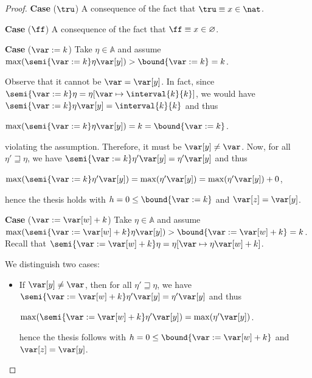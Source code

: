 \begin{proof}
  \medskip
  
  \noindent
  \textbf{Case} (\(\tru\))
  A consequence of the fact that \(\tru \equiv x\in \nat\). 

  \medskip
  
  \noindent
  \textbf{Case} (\(\ff\))
  A consequence of the fact that \(\ff \equiv x\in \varnothing\). 


  
  \medskip
  
  \noindent
  \textbf{Case} (\(\var := k\))
  Take \(\eta \in \mathbb{A}\) and assume
  \(\max(\semi{\var := k}\eta \var[y]) > \bound{\var := k} = k\).

  Observe that it cannot be \(\var = \var[y]\). In fact, since
  \(\semi{\var := k}\eta = \eta[\var \mapsto \interval{k}{k}]\), we would have
  \(\semi{\var := k}\eta \var[y] = \interval{k}{k}\) and thus
  \begin{center}
    \(\max(\semi{\var := k}\eta \var[y]) = k  = \bound{\var := k}\).
  \end{center}
  violating the assumption.
  Therefore, it must be \(\var[y] \neq \var\). Now, for all
  \(\eta' \sqsupseteq \eta\), we have
  \(\semi{\var := k}\eta' \var[y] = \eta' \var[y]\) and thus
  \begin{center}
    \(\max(\semi{\var := k}\eta' \var[y]) = \max(\eta' \var[y]) =
    \max(\eta' \var[y]) + 0\),
  \end{center}
  hence the thesis holds with \(h =0 \leq \bound{\var :=k}\) and \(\var[z] = \var[y]\).
  

  
  \medskip
  
  \noindent
  \textbf{Case} (\(\var := \var[w] + k\))
  Take \(\eta \in \mathbb{A}\) and assume
  \(\max(\semi{\var := \var[w] + k}\eta \var[y]) > \bound{\var := \var[w] + k} = k\).
  Recall that
  \(\semi{\var := \var[w] + k}\eta = \eta[\var \mapsto \eta \var[w] + k]\).
  
  We distinguish two cases:
  \begin{itemize}
    
  \item If \(\var[y] \neq \var\), then for all \(\eta' \sqsupseteq \eta\), we have
    \(\semi{\var := \var[w] + k}\eta' \var[y] = \eta' \var[y]\) and thus
    \begin{center}
      \(\max(\semi{\var := \var[w] + k}\eta' \var[y]) = \max(\eta' \var[y])\).
    \end{center}
    hence the thesis follows with
    \(h =0 \leq \bound{\var := \var[w] + k}\) and \(\var[z] = \var[y]\).
    

\end{itemize}
\end{proof}
